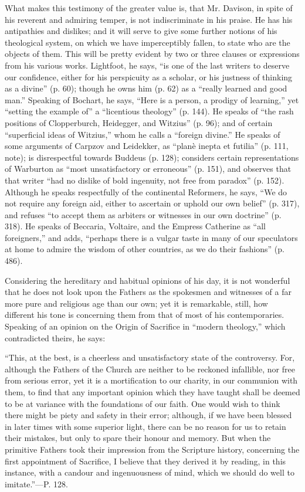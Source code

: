 What makes this testimony of the greater value
is, that Mr. Davison, in spite of his reverent and admiring temper, is
not indiscriminate in his praise. He has his antipathies and dislikes;
and it will serve to give some further notions of his theological
system, on which we have imperceptibly fallen, to state who are the
objects of them. This will be pretty evident by two or three clauses
or expressions from his various works. Lightfoot, he says, ``is one of
the last writers to deserve our confidence, either for his perspicuity
as a scholar, or his justness of thinking as a divine'' (p. 60); though
he owns him (p. 62) as a ``really learned and good man.'' Speaking of
Bochart, he says, ``Here is a person, a prodigy of learning,'' yet ``setting
the example of'' a ``licentious theology'' (p. 144). He speaks of ``the
rash positions of Clopperburch, Heidegger, and Witzius'' (p. 96);
and of certain ``superficial ideas of Witzius,'' whom he calls a ``foreign
divine.'' He speaks of some arguments of Carpzov and Leidekker, as ``planè
inepta et futilia'' (p. 111, note); is disrespectful towards Buddeus
(p. 128); considers certain representations of Warburton as ``most
unsatisfactory or erroneous'' (p. 151), and observes that that writer ``had
no dislike of bold ingenuity, not free from paradox'' (p. 152).
Although he speaks respectfully of the continental Reformers, he says,
``We do not require any foreign aid, either to ascertain or uphold our
own belief'' (p. 317), and refuses ``to accept them as arbiters or
witnesses in our own doctrine'' (p. 318). He speaks of Beccaria,
Voltaire, and the Empress Catherine as ``all foreigners,'' and adds, ``perhaps
there is a vulgar taste in many of our speculators at home to admire
the wisdom of other countries, as we do their fashions'' (p. 486).

Considering the hereditary and habitual opinions
of his day, it is not wonderful that he does not look upon the Fathers
as the spokesmen and witnesses of a far more pure and religious age
than our own; yet it is remarkable, still, how different his tone is
concerning them from that of most of his contemporaries. Speaking of
an opinion on the Origin of Sacrifice in ``modern theology,'' which
contradicted theirs, he says:

``This,
at the best, is a cheerless and unsatisfactory state of the
controversy. For, although the Fathers of the Church are neither to be
reckoned infallible, nor free from serious error, yet it is a
mortification to our charity, in our communion with them, to find that
any important opinion which they have taught shall be deemed to be at
variance with the foundations of our faith. One would wish to think
there might be piety and safety in their error; although, if we have
been blessed in later times with some superior light, there can be no
reason for us to retain their mistakes, but only to spare their honour
and memory. But when the primitive Fathers took their impression from
the Scripture history, concerning the first appointment
of Sacrifice, I believe that they derived it by reading, in this
instance, with a candour and ingenuousness of mind, which we should do
well to imitate.''—P. 128.

